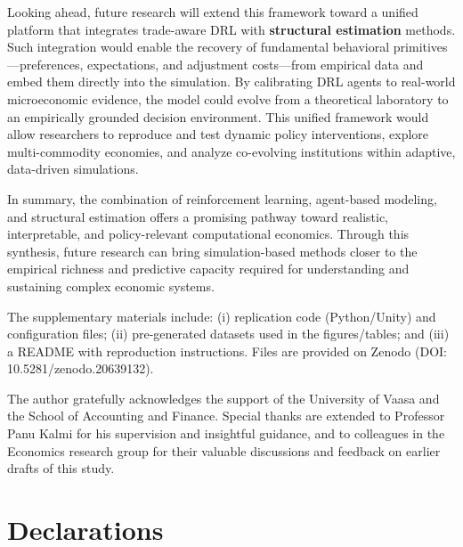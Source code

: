 \documentclass[pdflatex,sn-mathphys-num]{sn-jnl}%
\theoremstyle{thmstyleone}%
\theoremstyle{thmstyletwo}%
\theoremstyle{thmstylethree}%
\begin{document}
Looking ahead, future research will extend this framework toward a unified platform that integrates trade-aware DRL with \textbf{structural estimation} methods.  
Such integration would enable the recovery of fundamental behavioral primitives---preferences, expectations, and adjustment costs---from empirical data and embed them directly into the simulation.  
By calibrating DRL agents to real-world microeconomic evidence, the model could evolve from a theoretical laboratory to an empirically grounded decision environment.  
This unified framework would allow researchers to reproduce and test dynamic policy interventions, explore multi-commodity economies, and analyze co-evolving institutions within adaptive, data-driven simulations.

In summary, the combination of reinforcement learning, agent-based modeling, and structural estimation offers a promising pathway toward realistic, interpretable, and policy-relevant computational economics.  
Through this synthesis, future research can bring simulation-based methods closer to the empirical richness and predictive capacity required for understanding and sustaining complex economic systems.

\backmatter


The supplementary materials include: (i) replication code (Python/Unity) and
configuration files; (ii) pre-generated datasets used in the figures/tables; and (iii) a README with reproduction instructions. Files are provided on Zenodo (DOI: 10.5281/zenodo.20639132).


The author gratefully acknowledges the support of the University of Vaasa and the School of Accounting and Finance. 
Special thanks are extended to Professor Panu Kalmi for his supervision and insightful guidance, and to colleagues in the Economics research group for their valuable discussions and feedback on earlier drafts of this study.

\section*{Declarations}
\end{document}
